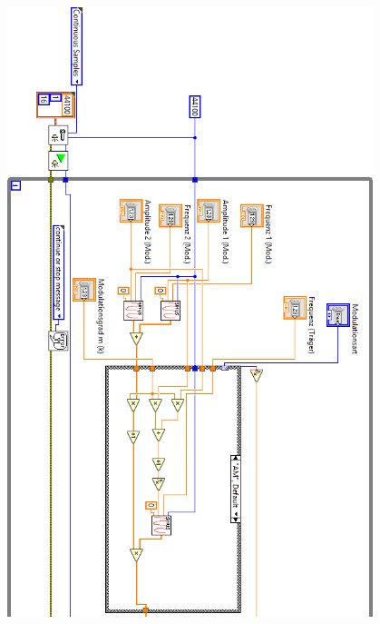 		\newpage
		\thispagestyle{empty}
		\begin{figure}[H]
			\centering
			\includegraphics[width=0.95\textwidth]{pic/am1.png}
		\end{figure} 
		
